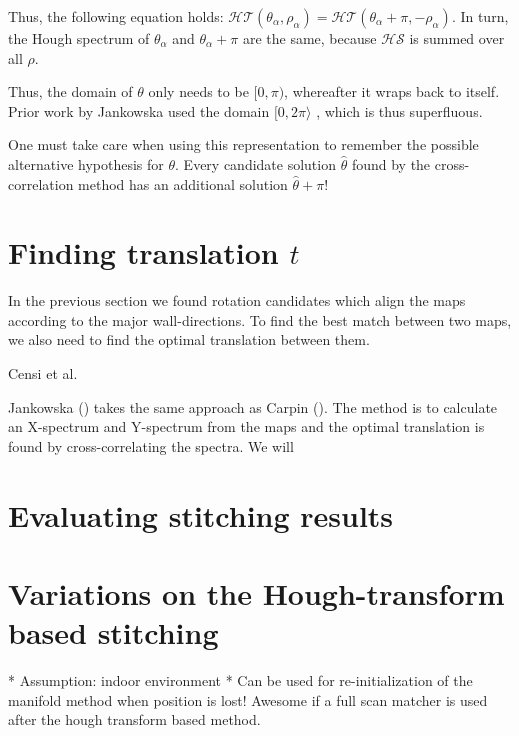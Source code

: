 Thus, the following equation holds: $\mathcal{HT}(\theta_\alpha, \rho_\alpha) = \mathcal{HT}(\theta_\alpha + \pi, -\rho_\alpha)$. In turn, the Hough spectrum of $\theta_\alpha$ and $\theta_\alpha + \pi$ are the same, because $\mathcal{HS}$ is summed over all $\rho$. 

Thus, the domain of $\theta$ only needs to be $[0, \pi)$, whereafter it wraps back to itself. Prior work by Jankowska used the domain $[0, 2\pi\rangle$ \cite{jankowska}, which is thus superfluous.

One must take care when using this representation to remember the possible alternative hypothesis for $\theta$. Every candidate solution $\hat\theta$ found by the cross-correlation method has an additional solution $\hat\theta + \pi$!

\section{Finding translation $t$}
In the previous section we found rotation candidates which align the maps according to the major wall-directions. To find the best match between two maps, we also need to find the optimal translation between them. 

Censi et al.\cite{}

Jankowska (\cite{jankowska2009hough}) takes the same approach as Carpin (\cite{carpin2008merging}). The method is to calculate an X-spectrum and Y-spectrum from the maps and the optimal translation is found by cross-correlating the spectra. We will 


\section{Evaluating stitching results}

\section{Variations on the Hough-transform based stitching}



* Assumption: indoor environment
* Can be used for re-initialization of the manifold method when position is lost! Awesome if a full scan matcher is used after the hough transform based method.